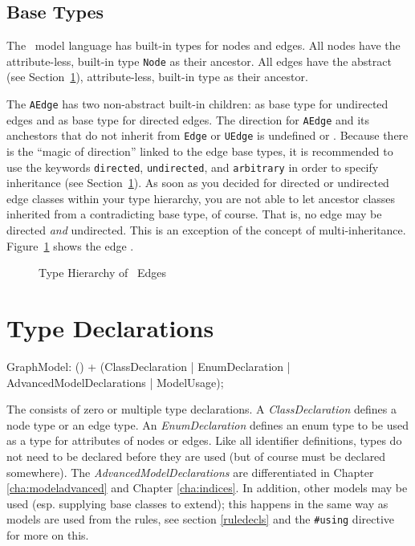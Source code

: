 \subsection{Base Types}
\label{sct:basetypes}
The \GrG\ model language has built-in types for nodes and edges.
All nodes have the attribute-less, built-in type \texttt{Node} as their ancestor.
All edges have the abstract (see Section~\ref{typedecl}), attribute-less, built-in type \texttt{} as their ancestor.

The \texttt{AEdge} has two non-abstract built-in children: \texttt{} as base type for undirected edges and \texttt{} as base type for directed edges.
The direction for \texttt{AEdge} and its anchestors that do not inherit from \texttt{Edge} or \texttt{UEdge} is undefined or .
Because there is the ``magic of direction'' linked to the edge base types, it is recommended to use the keywords \texttt{directed}, \texttt{undirected}, and \texttt{arbitrary} in order to specify inheritance (see Section~\ref{typedecl}).
As soon as you decided for directed or undirected edge classes within your type hierarchy, you are not able to let ancestor classes inherited from a contradicting base type, of course.
That is, no edge may be directed \emph{and} undirected.
This is an exception of the concept of multi-inheritance.
Figure~\ref{fig:basetypes} shows the edge .
\begin{figure}[htbp]
	\centering
	
	\caption{Type Hierarchy of \GrG\ Edges}
	\label{fig:basetypes}
\end{figure}


\section{Type Declarations}
\label{typedecl}

\begin{rail}
  GraphModel: () + (ClassDeclaration
  									 | EnumDeclaration
  									 | AdvancedModelDeclarations
  									 | ModelUsage);
\end{rail}
The  consists of zero or multiple type declarations.
A \emph{ClassDeclaration} defines a node type or an edge type.
An \emph{EnumDeclaration} defines an enum type to be used as a type for attributes of nodes or edges.
Like all identifier definitions, types do not need to be declared before they are used (but of course must be declared somewhere).
The \emph{AdvancedModelDeclarations} are differentiated in Chapter \ref{cha:modeladvanced} and Chapter \ref{cha:indices}.
In addition, other models may be used (esp. supplying base classes to extend); this happens in the same way as models are used from the rules, see section \ref{ruledecls} and the \verb/#using/ directive for more on this.


